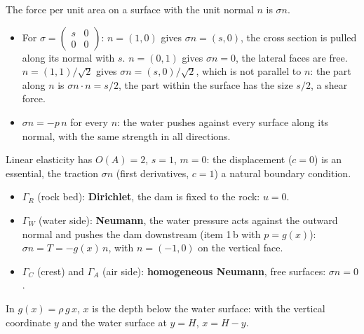 




 The force per unit area on a surface with the unit normal $n$ is $\sigma n$.
\begin{itemize}
  \item[a)] For $\sigma = \begin{pmatrix} s & 0 \\ 0 & 0 \end{pmatrix}$: $n = (1, 0)$ gives $\sigma n = (s, 0)$, the cross
    section is pulled along its normal with $s$. $n = (0, 1)$ gives $\sigma n = 0$, the lateral faces are free.
    $n = (1, 1)/\sqrt2$ gives $\sigma n = (s, 0)/\sqrt2$, which is not parallel to $n$: the part along $n$ is
    $\sigma n \cdot n = s/2$, the part within the surface has the size $s/2$, a shear force.
  \item[b)] $\sigma n = -p\, n$ for every $n$: the water pushes against every surface along its normal, with the same
    strength in all directions.
\end{itemize}

 Linear elasticity has $O(A) = 2$, $s = 1$, $m = 0$: the displacement ($c = 0$) is an essential, the traction
$\sigma n$ (first derivatives, $c = 1$) a natural boundary condition.
\begin{itemize}
  \item $\Gamma_R$ (rock bed): \textcolor{dir}{\textbf{Dirichlet}}, the dam is fixed to the rock: $u = 0$.
  \item $\Gamma_W$ (water side): \textcolor{neu}{\textbf{Neumann}}, the water pressure acts against the outward normal
    and pushes the dam downstream (item 1\,b with $p = g(x)$): $\sigma n = T = -g(x)\, n$, with $n = (-1, 0)$ on the
    vertical face.
  \item $\Gamma_C$ (crest) and $\Gamma_A$ (air side): \textcolor{neu}{\textbf{homogeneous Neumann}}, free surfaces:
    $\sigma n = 0$.
\end{itemize}
In $g(x) = \rho\, g\, x$, $x$ is the depth below the water surface: with the vertical coordinate $y$ and the water
surface at $y = H$, $x = H - y$.

